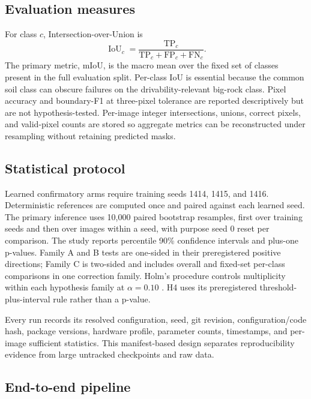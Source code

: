 \documentclass[11pt]{article}
\newcommand{\miou}{\ensuremath{\mathrm{mIoU}}}
\begin{document}
\subsection{Evaluation measures}

For class $c$, Intersection-over-Union is
\begin{equation}
\operatorname{IoU}_{c}=\frac{\mathrm{TP}_{c}}
{\mathrm{TP}_{c}+\mathrm{FP}_{c}+\mathrm{FN}_{c}}.
\end{equation}
The primary metric, \miou, is the macro mean over the fixed set of classes present in the full
evaluation split. Per-class IoU is essential because the common soil class can obscure failures on
the drivability-relevant big-rock class. Pixel accuracy and boundary-F1 at three-pixel tolerance are
reported descriptively but are not hypothesis-tested. Per-image integer intersections, unions,
correct pixels, and valid-pixel counts are stored so aggregate metrics can be reconstructed under
resampling without retaining predicted masks.

\subsection{Statistical protocol}

Learned confirmatory arms require training seeds 1414, 1415, and 1416. Deterministic references are
computed once and paired against each learned seed. The primary inference uses 10,000 paired
bootstrap resamples, first over training seeds and then over images within a seed, with purpose seed
0 reset per comparison. The study reports percentile 90\% confidence intervals and plus-one
p-values. Family A and B tests are one-sided in their preregistered positive directions; Family C is
two-sided and includes overall and fixed-set per-class comparisons in one correction family.
Holm's procedure controls multiplicity within each hypothesis family at $\alpha=0.10$
\cite{holm1979simple}. H4 uses its preregistered threshold-plus-interval rule rather than a p-value.

Every run records its resolved configuration, seed, git revision, configuration/code hash, package
versions, hardware profile, parameter counts, timestamps, and per-image sufficient statistics.
This manifest-based design separates reproducibility evidence from large untracked checkpoints and
raw data.

\subsection{End-to-end pipeline}
\end{document}
